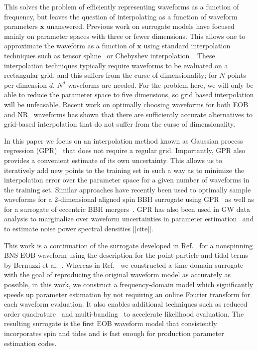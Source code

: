 \documentclass[prd,aps,letter,twocolumn,floatfix,notitlepage,nofootinbib]{revtex4-1}
\def\bx{\mathbf{x}}
\begin{document}
This solves the problem of efficiently representing waveforms as a function of frequency, but leaves the question of interpolating as a function of waveform parameters $\bx$ unanswered. Previous work on surrogate models have focused mainly on parameter spaces with three or fewer dimensions. This allows one to approximate the waveform as a function of $\bx$ using standard interpolation techniques such as tensor spline~\cite{Puerrer2014, Puerrer2015} or Chebyshev interpolation~\cite{LackeyBernuzziGalley2017}. These interpolation techniques typically require waveforms to be evaluated on a rectangular grid, and this suffers from the curse of dimensionality; for $N$ points per dimension $d$,  $N^d$ waveforms are needed. For the problem here, we will only be able to reduce the parameter space to five dimensions, so grid based interpolation will be unfeasable. Recent work on optimally choosing waveforms for both EOB~\cite{DoctorFarrHolz2017} and NR~\cite{BlackmanFieldScheel2017a, BlackmanFieldScheel2017b} waveforms has shown that there are sufficiently accurate alternatives to grid-based interpolation that do not suffer from the curse of dimensionality.

In this paper we focus on an interpolation method known as Gaussian process regression (GPR)~\cite{RasmussenWilliams2006} that does not require a regular grid. Importantly, GPR also provides a convenient estimate of its own uncertainty. This allows us to iteratively add new points to the training set in such a way as to minimize the interpolation error over the parameter space for a given number of waveforms in the training set. Similar approaches have recently been used to optimally sample waveforms for a 2-dimensional aligned spin BBH surrogate using GPR~\cite{DoctorFarrHolz2017} as well as for a surrogate of eccentric BBH mergers~\cite{HuertaMooreKumar2017}. GPR has also been used in GW data analysis to marginalize over waveform uncertainties in parameter estimation~\cite{MooreGair2014, MooreBerryChua2016} and to estimate noise power spectral densities [[cite]].

This work is a continuation of the surrogate developed in Ref.~\cite{LackeyBernuzziGalley2017} for a nonspinning BNS EOB waveform using the description for the point-particle and tidal terms by Bernuzzi et al.~\cite{Bernuzzi:2014owa}. Whereas in Ref.~\cite{LackeyBernuzziGalley2017} we constructed a time-domain surrogate with the goal of reproducing the original waveform model as accurately as possible, in this work, we construct a frequency-domain model which significantly speeds up parameter estimation by not requiring an online Fourier transform for each waveform evaluation. It also enables additional techniques such as reduced order quadrature~\cite{Antil2013, CanizaresFieldGair2013, CanizaresFieldGair2015} and multi-banding~\cite{VinciguerraVeitchMandel2017} to accelerate likelihood evaluation. The resulting surrogate is the first EOB waveform model that consistently incorporates spin and tides and is fast enough for production parameter estimation codes.
\end{document}
